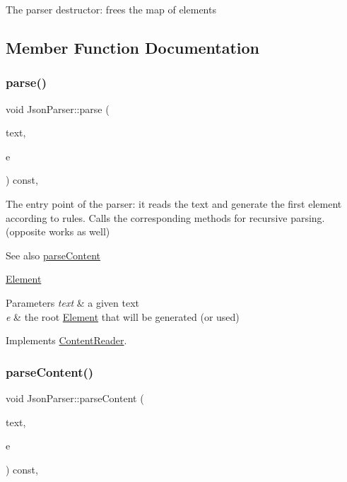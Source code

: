 The parser destructor\+: frees the map of elements 

\subsection{Member Function Documentation}
\mbox{\label{classJsonParser_a3ec3a9fcc8a63f987b4749d60b0568df}} 
\subsubsection{\texorpdfstring{parse()}{parse()}}
{\footnotesize\ttfamily void Json\+Parser\+::parse (\begin{DoxyParamCaption}\item[{std\+::string \&}]{text,  }\item[{\mbox{\hyperlink{classElement}{Element}} $\ast$$\ast$}]{e }\end{DoxyParamCaption}) const\hspace{0.3cm}{\ttfamily [override]}, {\ttfamily [virtual]}}

The entry point of the parser\+: it reads the text and generate the first element according to rules. Calls the corresponding methods for recursive parsing. (opposite works as well) \begin{DoxySeeAlso}{See also}
\mbox{\hyperlink{classJsonParser_ac80cf84ff2565f4c1f3a0f5ddb559c96}{parse\+Content}} 

\mbox{\hyperlink{classElement}{Element}}
\end{DoxySeeAlso}

\begin{DoxyParams}{Parameters}
{\em text} & a given text \\
\hline
{\em e} & the root \mbox{\hyperlink{classElement}{Element}} that will be generated (or used) \\
\hline
\end{DoxyParams}


Implements \mbox{\hyperlink{classContentReader_a7fff2e63a2e8fa216665604f69974e1d}{Content\+Reader}}.

\mbox{\label{classJsonParser_ac80cf84ff2565f4c1f3a0f5ddb559c96}} 
\subsubsection{\texorpdfstring{parse\+Content()}{parseContent()}\hspace{0.1cm}{\footnotesize\ttfamily [1/6]}}
{\footnotesize\ttfamily void Json\+Parser\+::parse\+Content (\begin{DoxyParamCaption}\item[{std\+::string \&}]{text,  }\item[{\mbox{\hyperlink{classElementInt}{Element\+Int}} $\ast$}]{e }\end{DoxyParamCaption}) const\hspace{0.3cm}{\ttfamily [override]}, {\ttfamily [virtual]}}

